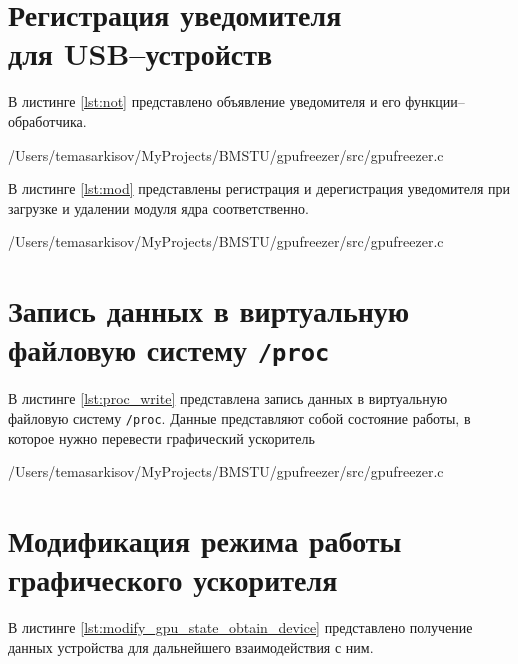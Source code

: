 \newpage
\section{Регистрация уведомителя\\ для USB--устройств}

В листинге \ref{lst:not} представлено объявление уведомителя и его функции--обработчика.

\begin{lstinputlisting}[
	caption={Уведомитель для USB--устройств},
	label={lst:not},
	style={c},
	linerange={192-214},
	]{/Users/temasarkisov/MyProjects/BMSTU/gpufreezer/src/gpufreezer.c}
\end{lstinputlisting}

В листинге \ref{lst:mod} представлены регистрация и дерегистрация уведомителя при загрузке и удалении модуля ядра соответственно.

\begin{lstinputlisting}[
	caption={Регистрация и дерегистрация уведомителя},
	label={lst:mod},
	style={c},
	linerange={216-249},
	]{/Users/temasarkisov/MyProjects/BMSTU/gpufreezer/src/gpufreezer.c}
\end{lstinputlisting}

\section{Запись данных в виртуальную\\файловую систему \texttt{/proc}}

В листинге \ref{lst:proc_write} представлена запись данных в виртуальную файловую систему \texttt{/proc}. Данные представляют собой состояние работы, в которое нужно перевести графический ускоритель

\begin{lstinputlisting}[
	caption={Запись данных в виртуальную файловую систему \texttt{/proc}},
	label={lst:proc_write},
	style={c},
	linerange={155-190},
	]{/Users/temasarkisov/MyProjects/BMSTU/gpufreezer/src/gpufreezer.c}
\end{lstinputlisting}

\section{Модификация режима работы графического ускорителя}

В листинге \ref{lst:modify_gpu_state_obtain_device} представлено получение данных устройства для дальнейшего взаимодействия с ним.

